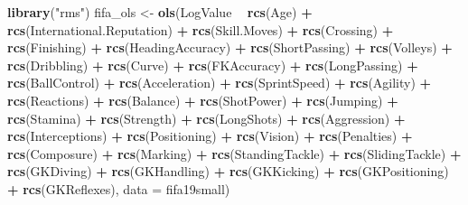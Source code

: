 \documentclass[12pt,]{krantz}
\newenvironment{Shaded}{\begin{snugshade}}{\end{snugshade}}
\newcommand{\DataTypeTok}[1]{\textcolor[rgb]{0.13,0.29,0.53}{#1}}
\newcommand{\KeywordTok}[1]{\textcolor[rgb]{0.13,0.29,0.53}{\textbf{#1}}}
\newcommand{\NormalTok}[1]{#1}
\newcommand{\OperatorTok}[1]{\textcolor[rgb]{0.81,0.36,0.00}{\textbf{#1}}}
\newcommand{\StringTok}[1]{\textcolor[rgb]{0.31,0.60,0.02}{#1}}
\begin{document}
\begin{Shaded}
\begin{Highlighting}[]
\KeywordTok{library}\NormalTok{(}\StringTok{"rms"}\NormalTok{)}
\NormalTok{fifa_ols <-}\StringTok{ }\KeywordTok{ols}\NormalTok{(LogValue }\OperatorTok{~}\StringTok{ }\KeywordTok{rcs}\NormalTok{(Age) }\OperatorTok{+}\StringTok{ }\KeywordTok{rcs}\NormalTok{(International.Reputation) }\OperatorTok{+}\StringTok{ }\KeywordTok{rcs}\NormalTok{(Skill.Moves) }\OperatorTok{+}\StringTok{ }\KeywordTok{rcs}\NormalTok{(Crossing) }\OperatorTok{+}\StringTok{ }\KeywordTok{rcs}\NormalTok{(Finishing) }\OperatorTok{+}\StringTok{ }\KeywordTok{rcs}\NormalTok{(HeadingAccuracy) }\OperatorTok{+}\StringTok{ }\KeywordTok{rcs}\NormalTok{(ShortPassing) }\OperatorTok{+}\StringTok{ }\KeywordTok{rcs}\NormalTok{(Volleys) }\OperatorTok{+}\StringTok{ }\KeywordTok{rcs}\NormalTok{(Dribbling) }\OperatorTok{+}\StringTok{ }\KeywordTok{rcs}\NormalTok{(Curve) }\OperatorTok{+}\StringTok{ }\KeywordTok{rcs}\NormalTok{(FKAccuracy) }\OperatorTok{+}\StringTok{ }\KeywordTok{rcs}\NormalTok{(LongPassing) }\OperatorTok{+}\StringTok{ }\KeywordTok{rcs}\NormalTok{(BallControl) }\OperatorTok{+}\StringTok{ }\KeywordTok{rcs}\NormalTok{(Acceleration) }\OperatorTok{+}\StringTok{ }\KeywordTok{rcs}\NormalTok{(SprintSpeed) }\OperatorTok{+}\StringTok{ }\KeywordTok{rcs}\NormalTok{(Agility) }\OperatorTok{+}\StringTok{ }\KeywordTok{rcs}\NormalTok{(Reactions) }\OperatorTok{+}\StringTok{ }\KeywordTok{rcs}\NormalTok{(Balance) }\OperatorTok{+}\StringTok{ }\KeywordTok{rcs}\NormalTok{(ShotPower) }\OperatorTok{+}\StringTok{ }\KeywordTok{rcs}\NormalTok{(Jumping) }\OperatorTok{+}\StringTok{ }\KeywordTok{rcs}\NormalTok{(Stamina) }\OperatorTok{+}\StringTok{ }\KeywordTok{rcs}\NormalTok{(Strength) }\OperatorTok{+}\StringTok{ }\KeywordTok{rcs}\NormalTok{(LongShots) }\OperatorTok{+}\StringTok{ }\KeywordTok{rcs}\NormalTok{(Aggression) }\OperatorTok{+}\StringTok{ }\KeywordTok{rcs}\NormalTok{(Interceptions) }\OperatorTok{+}\StringTok{ }\KeywordTok{rcs}\NormalTok{(Positioning) }\OperatorTok{+}\StringTok{ }\KeywordTok{rcs}\NormalTok{(Vision) }\OperatorTok{+}\StringTok{ }\KeywordTok{rcs}\NormalTok{(Penalties) }\OperatorTok{+}\StringTok{ }\KeywordTok{rcs}\NormalTok{(Composure) }\OperatorTok{+}\StringTok{ }\KeywordTok{rcs}\NormalTok{(Marking) }\OperatorTok{+}\StringTok{ }\KeywordTok{rcs}\NormalTok{(StandingTackle) }\OperatorTok{+}\StringTok{ }\KeywordTok{rcs}\NormalTok{(SlidingTackle) }\OperatorTok{+}\StringTok{ }\KeywordTok{rcs}\NormalTok{(GKDiving) }\OperatorTok{+}\StringTok{ }\KeywordTok{rcs}\NormalTok{(GKHandling) }\OperatorTok{+}\StringTok{ }\KeywordTok{rcs}\NormalTok{(GKKicking) }\OperatorTok{+}\StringTok{ }\KeywordTok{rcs}\NormalTok{(GKPositioning) }\OperatorTok{+}\StringTok{ }\KeywordTok{rcs}\NormalTok{(GKReflexes), }\DataTypeTok{data =}\NormalTok{ fifa19small)}
\end{Highlighting}
\end{Shaded}
\end{document}
